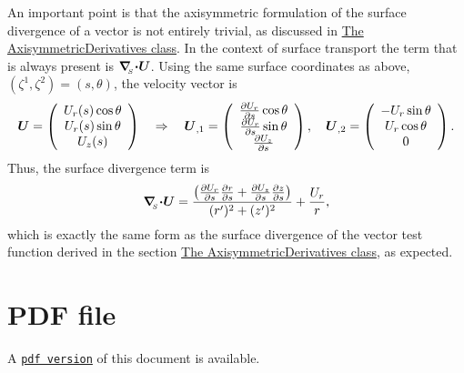 An important point is that the axisymmetric formulation of the surface divergence of a vector is not entirely trivial, as discussed in \hyperlink{index_axi}{The Axisymmetric\+Derivatives class}. In the context of surface transport the term that is always present is $ \mbox{\boldmath$\nabla$}_{\!\!_{S}}\mbox{\boldmath$\cdot$} \mbox{\boldmath$U$} $. Using the same surface coordinates as above, $ (\zeta^{1}, \zeta^{2}) = (s,\theta)$, the velocity vector is \[ \mbox{\boldmath$U$} = \left(\begin{array}{c} U_r(s)\cos\theta \\ U_r(s)\sin\theta \\ U_z(s) \end{array}\right) \quad\Rightarrow\quad \mbox{\boldmath$U$}_{,1} = \left(\begin{array}{c} \frac{\partial U_{r}}{\partial s}\cos\theta \\ \frac{\partial U_{r}}{\partial s} \sin\theta \\ \frac{\partial U_z}{\partial s} \end{array}\right), \quad \mbox{\boldmath$U$}_{,2} = \left(\begin{array}{c} -U_r \sin\theta \\ U_r\cos\theta \\ 0 \end{array}\right). \] Thus, the surface divergence term is \[ \mbox{\boldmath$\nabla$}_{\!\!_{S}} \mbox{\boldmath$\cdot$} \mbox{\boldmath$U$} = \frac{\left(\frac{\partial U_{r}}{\partial s} \frac{\partial r}{\partial s} + \frac{\partial U_{z}}{\partial s} \frac{\partial z}{\partial s}\right)}{(r')^{2} + (z')^{2}} + \frac{U_{r}}{r},\] which is exactly the same form as the surface divergence of the vector test function derived in the section \hyperlink{index_axi}{The Axisymmetric\+Derivatives class}, as expected.



 

 \hypertarget{index_pdf}{}\section{P\+D\+F file}\label{index_pdf}
A \href{../latex/refman.pdf}{\tt pdf version} of this document is available. 

